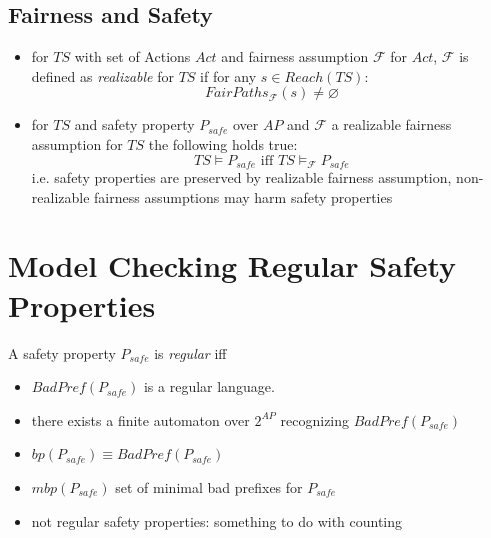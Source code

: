\documentclass[a4paper, 10pt]{article}
\begin{document}
\subsection*{Fairness and Safety}
\begin{itemize}
    \item for $TS$ with set of Actions $Act$ and fairness assumption $\mathcal{F}$ for $Act$, $\mathcal{F}$ is defined as \emph{realizable} for $TS$ if for any $s\in Reach(TS):$ \[ FairPaths_\mathcal{F}(s)\not=\varnothing \]
    \item for $TS$ and safety property $P_{safe}$ over $AP$ and $\mathcal{F}$ a realizable fairness assumption for $TS$ the following holds true: \[ TS\models P_{safe} \textrm{ iff } TS\models_\mathcal{F}P_{safe} \] {\tiny i.e. safety properties are preserved by realizable fairness assumption, non-realizable fairness assumptions may harm safety properties}
\end{itemize}

\section*{Model Checking Regular Safety Properties}
\begin{shaded}
A safety property $P_{safe}$ is \emph{regular} iff
\begin{itemize}
    \item $BadPref(P_{safe})$ is a regular language.
    \item there exists a finite automaton over $2^{AP}$ recognizing $BadPref(P_{safe})$
\end{itemize}
\end{shaded}
\begin{itemize}
    \item $bp(P_{safe}) \equiv BadPref(P_{safe})$
    \item $mbp(P_{safe})$ \follows \; set of minimal bad prefixes for $P_{safe}$
    \item not regular safety properties: something to do with counting
\end{itemize}
\end{document}
